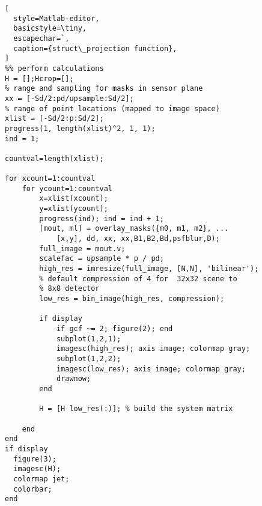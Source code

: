 \begin{lstlisting}[
  style=Matlab-editor,
  basicstyle=\tiny,
  escapechar=`,
  caption={struct\_projection function},
]
%% perform calculations
H = [];Hcrop=[];
% range and sampling for masks in sensor plane
xx = [-Sd/2:pd/upsample:Sd/2]; 
% range of point locations (mapped to image space)
xlist = [-Sd/2:p:Sd/2]; 
progress(1, length(xlist)^2, 1, 1);
ind = 1;

countval=length(xlist);

for xcount=1:countval
    for ycount=1:countval
        x=xlist(xcount);
        y=xlist(ycount);
        progress(ind); ind = ind + 1;
        [mout, ml] = overlay_masks({m0, m1, m2}, ...
            [x,y], dd, xx, xx,B1,B2,Bd,psfblur,D);
        full_image = mout.v;
        scalefac = upsample * p / pd;
        high_res = imresize(full_image, [N,N], 'bilinear');
        % default compression of 4 for  32x32 scene to 
        % 8x8 detector              
        low_res = bin_image(high_res, compression); 
        
        if display
            if gcf ~= 2; figure(2); end
            subplot(1,2,1);
            imagesc(high_res); axis image; colormap gray;
            subplot(1,2,2);
            imagesc(low_res); axis image; colormap gray;
            drawnow;
        end
        
        H = [H low_res(:)]; % build the system matrix
       
    end
end
if display
  figure(3); 
  imagesc(H); 
  colormap jet; 
  colorbar;
end
\end{lstlisting}


